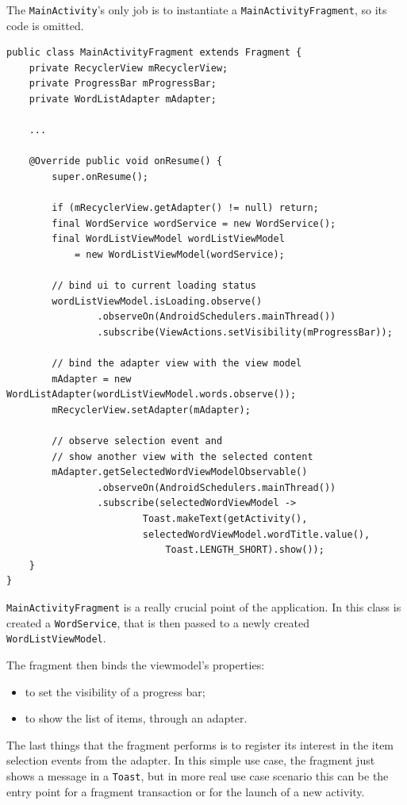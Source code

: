 The \texttt{MainActivity}'s only job is to instantiate a
\texttt{MainActivityFragment}, so its code is omitted.

\begin{verbatim}
public class MainActivityFragment extends Fragment {
    private RecyclerView mRecyclerView;
    private ProgressBar mProgressBar;
    private WordListAdapter mAdapter;

    ...

    @Override public void onResume() {
        super.onResume();

        if (mRecyclerView.getAdapter() != null) return; 
        final WordService wordService = new WordService();
        final WordListViewModel wordListViewModel 
        	= new WordListViewModel(wordService);

        // bind ui to current loading status
        wordListViewModel.isLoading.observe()
                .observeOn(AndroidSchedulers.mainThread())
                .subscribe(ViewActions.setVisibility(mProgressBar));

        // bind the adapter view with the view model
        mAdapter = new WordListAdapter(wordListViewModel.words.observe());
        mRecyclerView.setAdapter(mAdapter);

        // observe selection event and 
        // show another view with the selected content
        mAdapter.getSelectedWordViewModelObservable()
                .observeOn(AndroidSchedulers.mainThread())
                .subscribe(selectedWordViewModel ->
                        Toast.makeText(getActivity(),
                        selectedWordViewModel.wordTitle.value(), 
                        	Toast.LENGTH_SHORT).show());
    }
}
\end{verbatim}

\texttt{MainActivityFragment} is a really crucial point of the
application. In this class is created a \texttt{WordService}, that is
then passed to a newly created \texttt{WordListViewModel}.

The fragment then binds the viewmodel's properties:

\begin{itemize}
\itemsep1pt\parskip0pt
\item
  to set the visibility of a progress bar;
\item
  to show the list of items, through an adapter.
\end{itemize}

The last things that the fragment performs is to register its interest
in the item selection events from the adapter. In this simple use case,
the fragment just shows a message in a \texttt{Toast}, but in more real
use case scenario this can be the entry point for a fragment transaction
or for the launch of a new activity.

